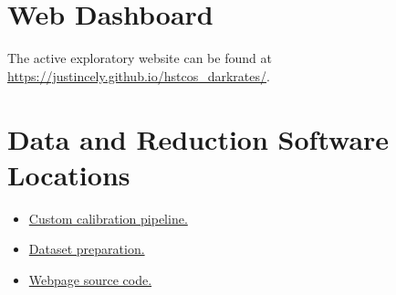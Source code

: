 \documentclass[a4paper,11pt]{article}
\begin{document}
\pagebreak

\appendix
\section{Web Dashboard}
The active exploratory website can be found at \href{https://justincely.github.io/hstcos\_darkrates/}{https://justincely.github.io/hstcos\_darkrates/}.

\section{Data and Reduction Software Locations}

\begin{itemize}
	\item \href{https://github.com/justincely/calcos/tree/subsolarlink}{Custom calibration pipeline.}
	\item \href{https://github.com/justincely/hstcos\_dark\_data.git}{Dataset preparation.}
	\item \href{https://github.com/justincely/hstcos\_darkrates.git}{Webpage source code.}
\end{itemize}

\end{document}
